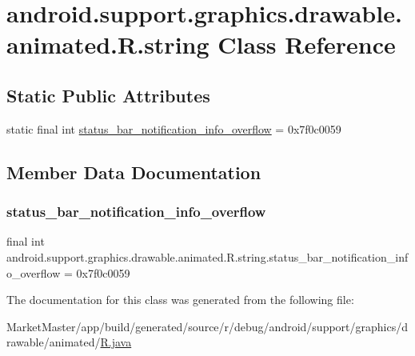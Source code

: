 \hypertarget{classandroid_1_1support_1_1graphics_1_1drawable_1_1animated_1_1R_1_1string}{}\section{android.\+support.\+graphics.\+drawable.\+animated.\+R.\+string Class Reference}
\label{classandroid_1_1support_1_1graphics_1_1drawable_1_1animated_1_1R_1_1string}
\subsection*{Static Public Attributes}
\begin{DoxyCompactItemize}
\item 
static final int \mbox{\hyperlink{classandroid_1_1support_1_1graphics_1_1drawable_1_1animated_1_1R_1_1string_adb1e336cab06d5a619196b54c531a8fe}{status\+\_\+bar\+\_\+notification\+\_\+info\+\_\+overflow}} = 0x7f0c0059
\end{DoxyCompactItemize}


\subsection{Member Data Documentation}
\mbox{\label{classandroid_1_1support_1_1graphics_1_1drawable_1_1animated_1_1R_1_1string_adb1e336cab06d5a619196b54c531a8fe}} 
\subsubsection{\texorpdfstring{status\+\_\+bar\+\_\+notification\+\_\+info\+\_\+overflow}{status\_bar\_notification\_info\_overflow}}
{\footnotesize\ttfamily final int android.\+support.\+graphics.\+drawable.\+animated.\+R.\+string.\+status\+\_\+bar\+\_\+notification\+\_\+info\+\_\+overflow = 0x7f0c0059\hspace{0.3cm}{\ttfamily [static]}}



The documentation for this class was generated from the following file\+:\begin{DoxyCompactItemize}
\item 
Market\+Master/app/build/generated/source/r/debug/android/support/graphics/drawable/animated/\mbox{\hyperlink{debug_2android_2support_2graphics_2drawable_2animated_2R_8java}{R.\+java}}\end{DoxyCompactItemize}
